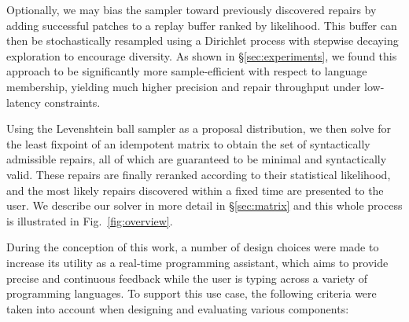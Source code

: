 \documentclass[sigplan,review,anonymous,acmsmall]{acmart}\settopmatter{printfolios=false,printccs=false,printacmref=false}
\begin{document}
Optionally, we may bias the sampler toward previously discovered repairs by adding successful patches to a replay buffer ranked by likelihood. This buffer can then be stochastically resampled using a Dirichlet process with stepwise decaying exploration to encourage diversity. As shown in \S\ref{sec:experiments}, we found this approach to be significantly more sample-efficient with respect to language membership, yielding much higher precision and repair throughput under low-latency constraints.

Using the Levenshtein ball sampler as a proposal distribution, we then solve for the least fixpoint of an idempotent matrix to obtain the set of syntactically admissible repairs, all of which are guaranteed to be minimal and syntactically valid. These repairs are finally reranked according to their statistical likelihood, and the most likely repairs discovered within a fixed time are presented to the user. We describe our solver in more detail in \S\ref{sec:matrix} and this whole process is illustrated in Fig.~\ref{fig:overview}.

During the conception of this work, a number of design choices were made to increase its utility as a real-time programming assistant, which aims to provide precise and continuous feedback while the user is typing across a variety of programming languages. To support this use case, the following criteria were taken into account when designing and evaluating various components:
\end{document}
